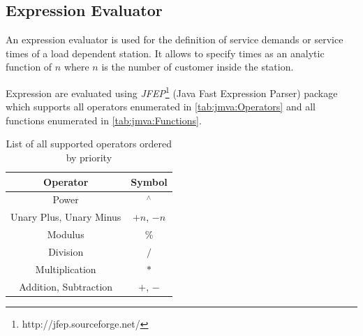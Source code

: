 \subsection{Expression Evaluator}
\label{sec:jmva:JEP} An expression evaluator is used for the
definition of service demands or service times of a load dependent
station. It allows to specify times as an analytic function of $n$
where $n$ is the number of customer inside the station.

Expression are evaluated using
\emph{JFEP}\footnote{http://jfep.sourceforge.net/} (Java Fast Expression Parser) package which supports all operators
enumerated in \autoref{tab:jmva:Operators} and all functions
enumerated in \autoref{tab:jmva:Functions}.

\begin{table}[htbp]
\begin{center}
\begin{tabular}{|c|c|}
Operator & Symbol\\
\hline
Power & $^{\wedge}$\\
Unary Plus, Unary Minus & $+n$, $-n$\\
Modulus & $\%$\\
Division & $/$ \\
Multiplication & $*$\\
Addition, Subtraction & $+$, $-$\\
\hline
\end{tabular}
\end{center}
\caption{List of all supported operators ordered by priority}
\label{tab:jmva:Operators}
\end{table}

